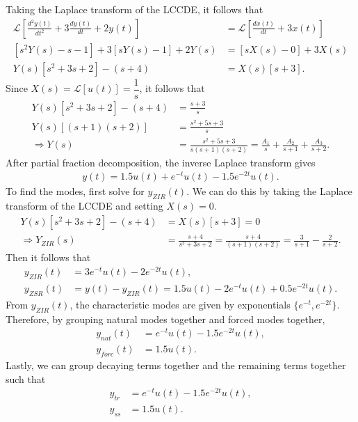 \documentclass{report}
\begin{document}
\begin{solution}
    Taking the Laplace transform of the LCCDE, it follows that 
    \begin{align*}
        \mathcal{L}\left[\frac{d^2y(t)}{dt^2} + 3\frac{dy(t)}{dt} + 2y(t)\right] &= \mathcal{L}\left[\frac{dx(t)}{dt} + 3x(t)\right] \\
        [s^2Y(s)-s-1] + 3[sY(s)-1] + 2Y(s) &= [sX(s)-0] + 3X(s) \\
        Y(s)[s^2+3s+2] - (s+4) &= X(s)[s+3].
    \end{align*}
    Since $X(s) = \mathcal{L}[u(t)] = \dfrac{1}{s}$, it follows that
    \begin{align*}
        Y(s)[s^2+3s+2] - (s+4) &= \frac{s+3}{s} \\
        Y(s)[(s+1)(s+2)] &= \frac{s^2+5s+3}{s} \\
        \Longrightarrow Y(s) &= \frac{s^2+5s+3}{s(s+1)(s+2)} = \frac{A_1}{s} + \frac{A_2}{s+1} + \frac{A_3}{s+2}.
    \end{align*}
    After partial fraction decomposition, the inverse Laplace transform gives 
    \begin{align*}
        y(t) = 1.5u(t) + e^{-t}u(t) -1.5e^{-2t}u(t).
    \end{align*}
    To find the modes, first solve for $y_{ZIR}(t)$. We can do this by taking the Laplace transform of the LCCDE and setting $X(s)=0$.
    \begin{align*}
        Y(s)[s^2+3s+2] - (s+4) &= X(s)[s+3] = 0 \\
        \Longrightarrow Y_{ZIR}(s) &= \frac{s+4}{s^2+3s+2} = \frac{s+4}{(s+1)(s+2)} = \frac{3}{s+1} - \frac{2}{s+2}.
    \end{align*}
    Then it follows that 
    \begin{align*}
        y_{ZIR}(t) &= 3e^{-t}u(t) - 2e^{-2t}u(t), \\
        y_{ZSR}(t) &= y(t) - y_{ZIR}(t) = 1.5u(t) - 2e^{-t}u(t) + 0.5e^{-2t}u(t).
    \end{align*}
    From $y_{ZIR}(t)$, the characteristic modes are given by exponentials $\{e^{-t}, e^{-2t}\}$. Therefore, by grouping natural modes together and forced modes together, 
    \begin{align*}
        y_{nat}(t) &= e^{-t}u(t) - 1.5e^{-2t}u(t), \\
        y_{forc}(t) &= 1.5u(t).
    \end{align*}
    Lastly, we can group decaying terms together and the remaining terms together such that 
    \begin{align*}
        y_{tr} &= e^{-t}u(t) - 1.5e^{-2t}u(t), \\
        y_{ss} &= 1.5u(t).
    \end{align*}
\end{solution}
\end{document}
